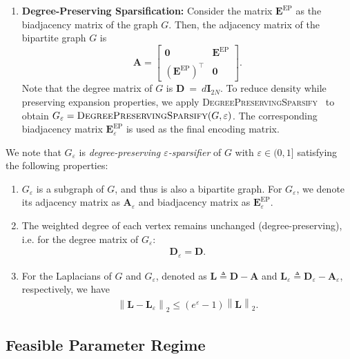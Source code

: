 \documentclass[lettersize,journal]{IEEEtran}
\newcommand{\adj}{\a}
\renewcommand{\deg}{\boldsymbol{D}}
\newcommand{\lap}{\boldsymbol{L}}
\newcommand{\norm}[1]{\left\lVert#1\right\rVert}
\newcommand{\ident}[1]{\boldsymbol{I}_{#1}}
\newcommand{\allzeros}[1]{\boldsymbol{0}_{#1}}
\newcommand{\GEP}{\boldsymbol{E}^{\mathrm{EP}}}
\renewcommand{\a}{\boldsymbol{a}}
\renewcommand{\adj}{\boldsymbol{A}}
\begin{document}
\begin{enumerate}
    \item \textbf{Degree-Preserving Sparsification:} 
    Consider the matrix $\GEP$ as the biadjacency matrix of the graph $G$.
    Then, the adjacency matrix of the bipartite graph $G$ is
    \begin{equation*}
    \adj = \begin{bmatrix}
    \allzeros{} &  \GEP\\
        (\GEP)^\top & \allzeros{}
    \end{bmatrix}.
    \end{equation*}
    Note that the degree matrix of $G$ is $\deg~= ~d\ident{2N}$.
    To reduce density while preserving expansion properties, we apply \textsc{DegreePreservingSparsify}~\cite{degree-preserving-sparsifier} to obtain $G_\varepsilon = \textsc{DegreePreservingSparsify}(G,\varepsilon)$. The corresponding biadjacency matrix $\GEP_\varepsilon$ is used as the final encoding matrix.
    \end{enumerate}
     
We note that $G_\varepsilon$ is \emph{degree-preserving $\varepsilon$-sparsifier} of $G$ with $\varepsilon\in(0,1]$ satisfying the following properties:
    \begin{enumerate}
    \item $G_\varepsilon$ is a subgraph of $G$, and thus is also a bipartite graph. For $G_\varepsilon$, we denote its adjacency matrix as $\adj_\varepsilon$ and biadjacency matrix as $\GEP_\varepsilon$.
    \item 
    The weighted degree of each vertex remains unchanged (degree-preserving), i.e. for the degree matrix of $G_\varepsilon$:
    \begin{align}
    \label{eq:degree-preserved}
        \deg_\varepsilon = \deg.
    \end{align}
    \item For the Laplacians of $G$ and $G_\varepsilon$, denoted as $\lap\triangleq \deg - \adj$ and $\lap_{\varepsilon}\triangleq \deg_{\varepsilon} - \adj_\varepsilon$, respectively, we have
    \begin{align}
    \label{eq:lap-diff-bound}
        \norm{\lap - \lap_\varepsilon}_2 \le (e^{\varepsilon}-1) \norm{\lap}_2.
    \end{align}
    \end{enumerate}


\subsection{Feasible Parameter Regime}
\label{sec:sparse-graph-feasible-parameter-regime}
\end{document}
